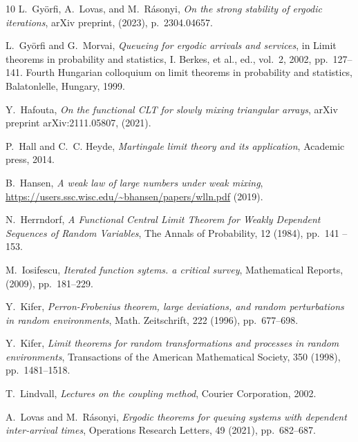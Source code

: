 \documentclass[a4paper,10pt]{article}
\begin{document}
\begin{thebibliography}{10}
	{\sc L.~Gy\"orfi, A.~Lovas, and M.~R\'asonyi}, {\em On the strong stability of
		ergodic iterations}, arXiv preprint,  (2023), p.~2304.04657.
	
	{\sc L.~Gy\"orfi and G.~Morvai}, {\em Queueing for ergodic arrivals and
		services}, in Limit theorems in probability and statistics, {I. Berkes, et
		al.}, ed., vol.~2, 2002, pp.~127--141.
	\newblock Fourth Hungarian colloquium on limit theorems in probability and
	statistics, Balatonlelle, Hungary, 1999.
	
	{\sc Y.~Hafouta}, {\em On the functional CLT for slowly mixing triangular
		arrays}, arXiv preprint arXiv:2111.05807,  (2021).
	
	{\sc P.~Hall and C.~C. Heyde}, {\em Martingale limit theory and its
		application}, Academic press, 2014.
	
%	
	{\sc B.~Hansen}, {\em A weak law of large numbers under weak mixing}, {\url{https://users.ssc.wisc.edu/~bhansen/papers/wlln.pdf}} (2019).
	
	{\sc N.~Herrndorf}, {\em {A Functional Central Limit Theorem for Weakly
			Dependent Sequences of Random Variables}}, The Annals of Probability, 12
	(1984), pp.~141 -- 153.
	
	{\sc M.~Iosifescu}, {\em Iterated function sytems. a critical survey},
	Mathematical Reports,  (2009), pp.~181--229.
	
	{\sc Y.~Kifer}, {\em Perron-{F}robenius theorem, large deviations, and random
		perturbations in random environments}, Math. Zeitschrift, 222 (1996),
	pp.~677--698.
	
	{\sc Y.~Kifer}, {\em Limit theorems for random transformations and processes in
		random environments}, Transactions of the American Mathematical Society, 350
	(1998), pp.~1481--1518.
	
	{\sc T.~Lindvall}, {\em Lectures on the coupling method}, Courier Corporation,
	2002.
	
	{\sc A.~Lovas and M.~R{\'a}sonyi}, {\em Ergodic theorems for queuing systems
		with dependent inter-arrival times}, Operations Research Letters, 49 (2021),
	pp.~682--687.
	

\end{thebibliography}
\end{document}
